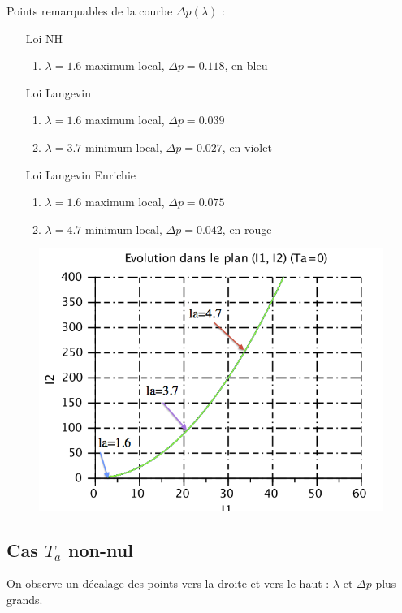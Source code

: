 \documentclass[a4paper,11pt]{article}
\begin{document}
Points remarquables de la courbe $\Delta p(\lambda)$ :
\begin{itemize}
	\item[Loi NH]
	\begin{enumerate}
	\item $\lambda = 1.6$ maximum local, $\Delta p = 0.118$, en bleu
	\end{enumerate}
	\item[Loi Langevin]
	\begin{enumerate}
	\item $\lambda = 1.6$ maximum local, $\Delta p = 0.039$
	\item $\lambda = 3.7$ minimum local, $\Delta p = 0.027$, en violet
	\end{enumerate}
	\item[Loi Langevin Enrichie]
	\begin{enumerate}
	\item $\lambda = 1.6$ maximum local, $\Delta p = 0.075$
	\item $\lambda = 4.7$ minimum local, $\Delta p = 0.042$, en rouge
	\end{enumerate}
\end{itemize}
\begin{figure}[!h]
\centering\includegraphics[scale=1.2]{scilab/q533.png}
\end{figure}
\FloatBarrier



\subsection{Cas $T_a$ non-nul}
On observe un décalage des points vers la droite et vers le haut : $\lambda$ et $\Delta p$ plus grands.
\end{document}
